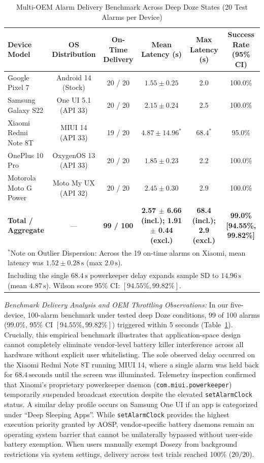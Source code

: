 \documentclass[11pt,a4paper]{article}
\begin{document}
\begin{table}[htbp]
\centering
\small
\caption{Multi-OEM Alarm Delivery Benchmark Across Deep Doze States (20 Test Alarms per Device)}
\label{tab:oem_benchmark}
\begin{tabular}{lccccc}
\toprule
\textbf{Device Model} & \textbf{OS Distribution} & \textbf{On-Time Delivery} & \textbf{Mean Latency (s)} & \textbf{Max Latency (s)} & \textbf{Success Rate (95\% CI)} \\
\midrule
Google Pixel 7 & Android 14 (Stock) & 20 / 20 & $1.55 \pm 0.25$ & 2.0 & 100.0\% \\
Samsung Galaxy S22 & One UI 5.1 (API 33) & 20 / 20 & $2.15 \pm 0.24$ & 2.5 & 100.0\% \\
Xiaomi Redmi Note 8T & MIUI 14 (API 33) & 19 / 20 & $4.87 \pm 14.96^*$ & $68.4^*$ & 95.0\% \\
OnePlus 10 Pro & OxygenOS 13 (API 33) & 20 / 20 & $1.85 \pm 0.23$ & 2.2 & 100.0\% \\
Motorola Moto G Power & Moto My UX (API 32) & 20 / 20 & $2.45 \pm 0.30$ & 2.9 & 100.0\% \\
\midrule
\textbf{Total / Aggregate} & --- & \textbf{99 / 100} & \textbf{2.57 $\pm$ 6.66 (incl.); 1.91 $\pm$ 0.44 (excl.)} & \textbf{68.4 (incl.); 2.9 (excl.)} & \textbf{99.0\% [94.55\%, 99.82\%]} \\
\bottomrule
\multicolumn{6}{l}{\footnotesize $^*$Note on Outlier Dispersion: Across the 19 on-time alarms on Xiaomi, mean latency was $1.52 \pm 0.28\,\text{s}$ (max $2.0\,\text{s}$).} \\
\multicolumn{6}{l}{\footnotesize Including the single $68.4\,\text{s}$ powerkeeper delay expands sample SD to $14.96\,\text{s}$ (mean $4.87\,\text{s}$). Wilson score 95\% CI: $[94.55\%, 99.82\%]$.}
\end{tabular}
\end{table}

\emph{Benchmark Delivery Analysis and OEM Throttling Observations:} In our five-device, 100-alarm benchmark under tested deep Doze conditions, 99 of 100 alarms ($99.0\%$, 95\% CI $[94.55\%, 99.82\%]$) triggered within 5 seconds (Table~\ref{tab:oem_benchmark}). Crucially, this empirical benchmark illustrates that application-space design cannot completely eliminate vendor-level battery killer interference across all hardware without explicit user whitelisting. The sole observed delay occurred on the Xiaomi Redmi Note 8T running MIUI 14, where a single alarm was held back for $68.4\,\text{seconds}$ until the screen was illuminated. Telemetry inspection confirmed that Xiaomi's proprietary powerkeeper daemon (\texttt{com.miui.powerkeeper}) temporarily suspended broadcast execution despite the elevated \texttt{setAlarmClock} status. A similar delay profile occurs on Samsung One UI if an app is categorized under ``Deep Sleeping Apps''. While \texttt{setAlarmClock} provides the highest execution priority granted by AOSP, vendor-specific battery daemons remain an operating system barrier that cannot be unilaterally bypassed without user-side battery exemption. When users manually exempt Dosezy from background restrictions via system settings, delivery across test trials reached 100\% ($20/20$).
\end{document}
